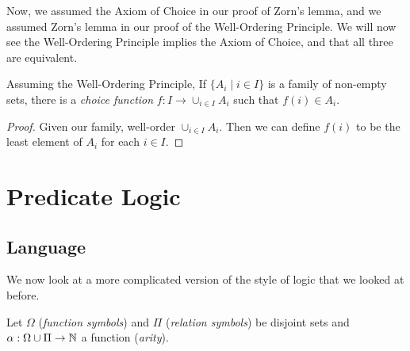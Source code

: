 \documentclass[a3paper, 10pt]{article}
\renewcommand{\vocab}[1]{\emph{#1}}
\begin{document}
\begin{multicols*}{5}
Now, we assumed the Axiom of Choice in our proof of Zorn's lemma, and we assumed Zorn's lemma in our proof of the Well-Ordering Principle. We will now see the Well-Ordering Principle implies the Axiom of Choice, and that all three are equivalent.

\begin{theorem}
  Assuming the Well-Ordering Principle, 
  If $\{A_i \mid i \in I\}$ is a family of non-empty sets, there is a \vocab{choice function} $f: I \rightarrow \cup_{i \in I} A_i$ such that $f(i) \in A_i$.
\end{theorem}
\begin{proof}
  Given our family, well-order $\cup_{i \in I} A_i$. Then we can define $f(i)$ to be the least element of $A_i$ for each $i \in I$.
\end{proof}


\section{Predicate Logic}

\subsection{Language}

We now look at a more complicated version of the style of logic that we looked at before.

\begin{definition}[Language]
  Let $\Omega$ (\vocab{function symbols}) and $\Pi$ (\vocab{relation symbols}) be disjoint sets and $\alpha: \Omega \cup \Pi \rightarrow \mathbb{N}$ a function (\vocab{arity}).


\end{definition}
\end{multicols*}
\end{document}
